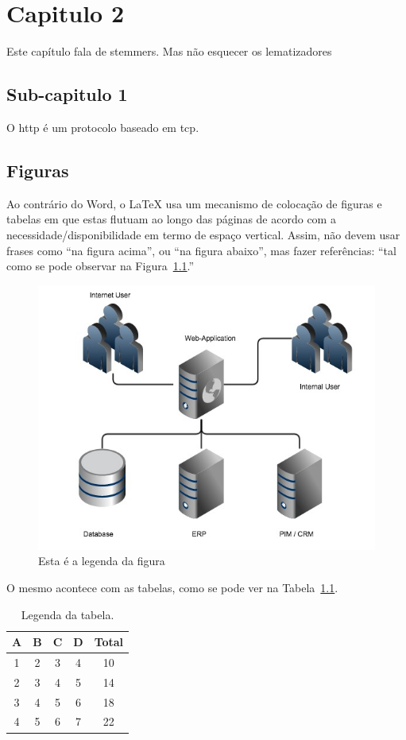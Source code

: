 
\chapter{Capitulo 2}

Este capítulo fala de \gls{stemmer}s. Mas não esquecer os \Gls{lematizador}es

\section{Sub-capitulo 1}

O \acrfull{http} é um protocolo baseado em \acrshort{tcp}.

\section{Figuras}

Ao contrário do Word, o \LaTeX{} usa um mecanismo de colocação de figuras e tabelas em que estas
flutuam ao longo das páginas de acordo com a necessidade/disponibilidade em termo de espaço vertical.
Assim, não devem usar frases como ``na figura acima'', ou ``na figura abaixo'', mas fazer referências:
``tal como se pode observar na Figura~\ref{fig:1}.''

\begin{figure}[htb]
    \centering
    \includegraphics[width=0.8\linewidth]{images/sample}  %
    \caption{Esta é a legenda da figura}
    \label{fig:1}
\end{figure}

O mesmo acontece com as tabelas, como se pode ver na Tabela~\ref{tab:1}.

\begin{table}[htb]
    \centering
    \begin{tabular}{ccccc}
        \toprule
        \textbf{A} & \textbf{B} & \textbf{C} & \textbf{D} & \textbf{Total} \\
        \midrule
          1 & 2 & 3 & 4 & 10  \\
          2 & 3 & 4 & 5 & 14  \\
          3 & 4 & 5 & 6 & 18  \\
          4 & 5 & 6 & 7 & 22  \\
         \bottomrule
    \end{tabular}
    \caption{Legenda da tabela.}
    \label{tab:1}
\end{table}

